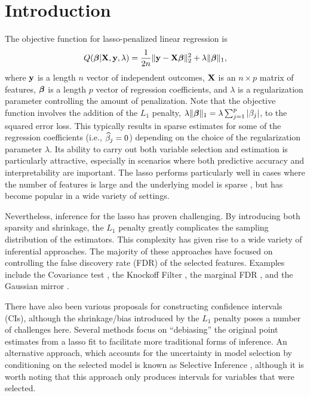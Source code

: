 \section{Introduction}

The objective function for lasso-penalized linear regression \citep{Tibshirani1996} is
$$Q(\boldsymbol{\beta}|\mathbf{X},\mathbf{y},\lambda) = \frac{1}{2n}\lVert\mathbf{y} - \mathbf{X}\boldsymbol{\beta}\rVert_2^2 + \lambda\lVert\boldsymbol{\beta}\rVert_1,$$
where $\mathbf{y}$ is a length $n$ vector of independent outcomes, $\mathbf{X}$ is an $n \times p$ matrix of features, $\boldsymbol{\beta}$ is a length $p$ vector of regression coefficients, and $\lambda$ is a regularization parameter controlling the amount of penalization. Note that the objective function involves the addition of the $L_1$ penalty, $\lambda\lVert\boldsymbol{\beta}\rVert_1 = \lambda \sum_{j = 1}^p |\beta_j|$, to the squared error loss. This typically results in sparse estimates for some of the regression coefficients (i.e., $\widehat{\beta}_j = 0$) depending on the choice of the regularization parameter $\lambda$. Its ability to carry out both variable selection and estimation is particularly attractive, especially in scenarios where both predictive accuracy and interpretability are important. The lasso performs particularly well in cases where the number of features is large and the underlying model is sparse \citep{HTF2009}, but has become popular in a wide variety of settings.

Nevertheless, inference for the lasso has proven challenging. By introducing both sparsity and shrinkage, the $L_1$ penalty greatly complicates the sampling distribution of the estimators. This complexity has given rise to a wide variety of inferential approaches. The majority of these approaches have focused on controlling the false discovery rate (FDR) of the selected features. Examples include the Covariance test \citep{Lockhart2014}, the Knockoff Filter \citep{Candes2015,Candes2018}, the marginal FDR \citep{Breheny2019}, and the Gaussian mirror \citep{Xing2023}.

There have also been various proposals for constructing confidence intervals (CIs), although the shrinkage/bias introduced by the $L_1$ penalty poses a number of challenges here. Several methods \citep{ZhangZhang2014, Javanmard2014} focus on ``debiasing'' the original point estimates from a lasso fit to facilitate more traditional forms of inference. An alternative approach, which accounts for the uncertainty in model selection by conditioning on the selected model is known as Selective Inference \citep{Lee2016}, although it is worth noting that this approach only produces intervals for variables that were selected.

